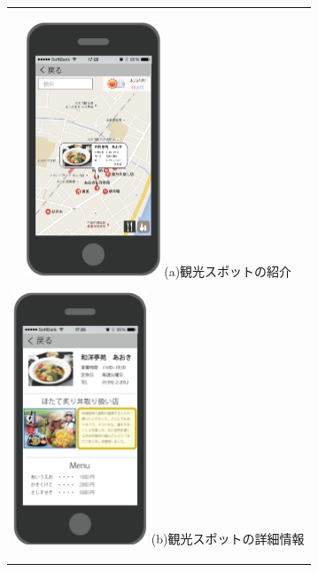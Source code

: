 \begin{figure}[htbp]
  \begin{center}
    \begin{tabular}{c}

      \begin{minipage}{0.33\hsize}
        \begin{center}
\includegraphics[width=4cm, bb=0 0 303 573]{5.2_map1.png}
          \hspace{1cm} (a)観光スポットの紹介
        \end{center}
      \end{minipage}

      \begin{minipage}{0.33\hsize}
        \begin{center}
\includegraphics[width=4cm, bb=0 0 304 570]{5.2_map2.png}
          \hspace{1cm} (b)観光スポットの詳細情報
        \end{center}
      \end{minipage}


\end{tabular}
\end{center}
\end{figure}
